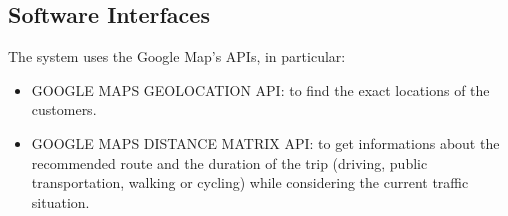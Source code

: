 \subsection{Software Interfaces}

The system uses the Google Map’s APIs, in particular:
\begin{itemize}
	\item GOOGLE MAPS GEOLOCATION API: to find the exact locations of the customers.
	\item GOOGLE MAPS DISTANCE MATRIX API: to get informations about the recommended route and the duration of the trip (driving, public transportation, walking or cycling) while considering the current traffic situation.
\end{itemize}